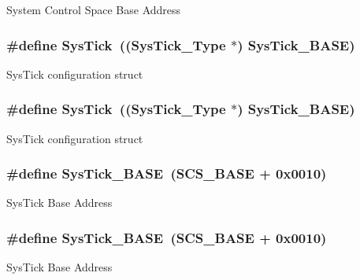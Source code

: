 System Control Space Base Address \hypertarget{group___c_m_s_i_s___c_m3__core__register_gacd96c53beeaff8f603fcda425eb295de}{
\subsubsection[{Sys\-Tick}]{\setlength{\rightskip}{0pt plus 5cm}\#define Sys\-Tick~(({\bf Sys\-Tick\-\_\-\-Type} $\ast$)       {\bf Sys\-Tick\-\_\-\-B\-A\-S\-E})}}\label{group___c_m_s_i_s___c_m3__core__register_gacd96c53beeaff8f603fcda425eb295de}
Sys\-Tick configuration struct \hypertarget{group___c_m_s_i_s___c_m3__core__register_gacd96c53beeaff8f603fcda425eb295de}{
\subsubsection[{Sys\-Tick}]{\setlength{\rightskip}{0pt plus 5cm}\#define Sys\-Tick~(({\bf Sys\-Tick\-\_\-\-Type} $\ast$)       {\bf Sys\-Tick\-\_\-\-B\-A\-S\-E})}}\label{group___c_m_s_i_s___c_m3__core__register_gacd96c53beeaff8f603fcda425eb295de}
Sys\-Tick configuration struct \hypertarget{group___c_m_s_i_s___c_m3__core__register_ga58effaac0b93006b756d33209e814646}{
\subsubsection[{Sys\-Tick\-\_\-\-B\-A\-S\-E}]{\setlength{\rightskip}{0pt plus 5cm}\#define Sys\-Tick\-\_\-\-B\-A\-S\-E~({\bf S\-C\-S\-\_\-\-B\-A\-S\-E} +  0x0010)}}\label{group___c_m_s_i_s___c_m3__core__register_ga58effaac0b93006b756d33209e814646}
Sys\-Tick Base Address \hypertarget{group___c_m_s_i_s___c_m3__core__register_ga58effaac0b93006b756d33209e814646}{
\subsubsection[{Sys\-Tick\-\_\-\-B\-A\-S\-E}]{\setlength{\rightskip}{0pt plus 5cm}\#define Sys\-Tick\-\_\-\-B\-A\-S\-E~({\bf S\-C\-S\-\_\-\-B\-A\-S\-E} +  0x0010)}}\label{group___c_m_s_i_s___c_m3__core__register_ga58effaac0b93006b756d33209e814646}
Sys\-Tick Base Address 